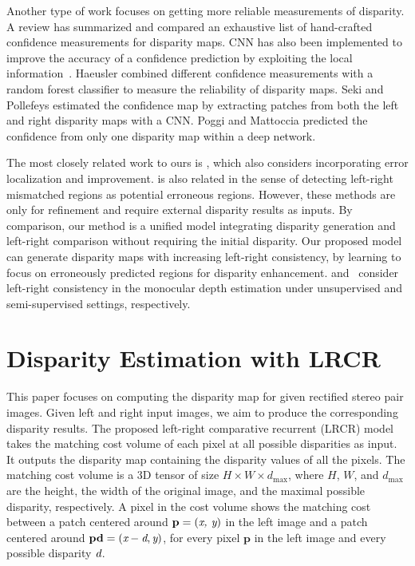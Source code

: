 \documentclass[10pt,twocolumn,letterpaper]{article}
\begin{document}
Another type of work focuses on getting more reliable  measurements of disparity. A review \cite{hu2012quantitative} has summarized and compared an exhaustive list of hand-crafted confidence measurements for disparity maps.  CNN has also been implemented to improve the accuracy of a confidence prediction by exploiting the local information~\cite{spyropoulos2014learning,haeusler2013ensemble,poggi2017learning,seki2016patch,park2015leveraging,poggi2017quantitative,poggi2016learning}. Haeusler \etal \cite{haeusler2013ensemble} combined different confidence measurements with a random forest classifier to measure the reliability of disparity maps. Seki and Pollefeys \cite{seki2016patch} estimated the confidence map by extracting patches from both the left and right disparity maps with a CNN. Poggi and Mattoccia \cite{poggi2017learning,poggi2016learning} predicted the confidence from only one disparity map within a deep network.

The most closely related work  to ours is \cite{gidaris2016detect},  which also considers  incorporating error localization and improvement.  \cite{seki2016patch} is also related in the sense of detecting left-right mismatched regions as potential erroneous  regions.  However, these methods are only for refinement  and require external disparity results as inputs. By comparison, our method is a unified model integrating disparity generation and left-right comparison without requiring the initial disparity. Our proposed model can generate    disparity maps with increasing left-right  consistency, by learning to focus  on erroneously predicted regions  for disparity enhancement. \cite{godard2017unsupervised} and~\cite{kuznietsov2017semi}  consider left-right consistency in the monocular depth estimation under unsupervised and semi-supervised settings, respectively.


\section{Disparity Estimation with LRCR}

This paper focuses on computing the disparity map for  given rectified stereo pair images. Given  left and  right input images, we aim to produce the corresponding disparity results. The proposed left-right comparative recurrent (LRCR) model takes the matching cost volume of each pixel at all possible disparities as input. It outputs the disparity map containing the disparity values of all the pixels. The matching cost volume is a 3D tensor of size $H \times W \times d_{\max}$, where $H$, $W$, and $d_{\max}$ are the height, the width of the original image, and the maximal possible disparity, respectively. A pixel in the cost volume shows the matching cost between a patch centered around $\mathbf{p} = (\emph{x, y})$ in the left image and a patch centered around $\mathbf{pd} = (\emph{x}-\emph{d}, \emph{y})$,  for every pixel $\mathbf{p}$ in the left image and every possible disparity $\emph{d}$. 
\end{document}
